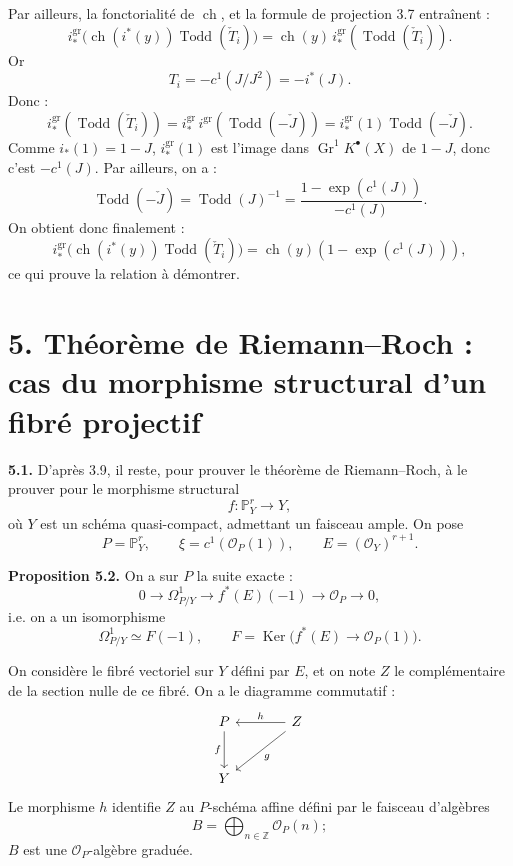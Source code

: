 \documentclass[11pt]{article}
\newcommand{\Gr}{\operatorname{Gr}}
\newcommand{\ch}{\operatorname{ch}}
\newcommand{\Todd}{\operatorname{Todd}}
\providecommand{\ch}{\operatorname{ch}}
\providecommand{\Todd}{\operatorname{Todd}}
\providecommand{\Gr}{\operatorname{Gr}}
\providecommand{\Ker}{\operatorname{Ker}}
\providecommand{\Gr}{\operatorname{G}}
\begin{document}
Par ailleurs, la fonctorialité de \(\ch\), et la formule de projection 3.7 entraînent :
\[
 i^{\mathrm{gr}}_*\bigl(\ch(i^*(y))\Todd(\check T_i)\bigr)
 =
 \ch(y)\,i^{\mathrm{gr}}_*(\Todd(\check T_i)).
\]
Or
\[
T_i=-c^1(J/J^2)=-i^*(J).
\]
Donc :
\[
 i^{\mathrm{gr}}_*(\Todd(\check T_i))
 =
 i^{\mathrm{gr}}_*\,i^{\mathrm{gr}}(\Todd(-\check J))
 =
 i^{\mathrm{gr}}_*(1)\Todd(-\check J).
\]
Comme \(i_*(1)=1-J\), \(i^{\mathrm{gr}}_*(1)\) est l'image dans \(\Gr^1K^{\bullet}(X)\) de \(1-J\), donc c'est \(-c^1(J)\). Par ailleurs, on a :
\[
 \Todd(-\check J)=\Todd(J)^{-1}
 =
 \frac{1-\exp(c^1(J))}{-c^1(J)}.
\]
On obtient donc finalement :
\[
 i^{\mathrm{gr}}_*\bigl(\ch(i^*(y))\Todd(\check T_i)\bigr)
 =
 \ch(y)(1-\exp(c^1(J))),
\]
ce qui prouve la relation à démontrer.

\section*{5. Théorème de Riemann--Roch : cas du morphisme structural d'un fibré projectif}

\textbf{5.1.} D'après 3.9, il reste, pour prouver le théorème de Riemann--Roch, à le prouver pour le morphisme structural
\[
f:\mathbb P^r_Y\longrightarrow Y,
\]
où \(Y\) est un schéma quasi-compact, admettant un faisceau ample. On pose
\[
P=\mathbb P^r_Y,\qquad \xi=c^1(\mathcal O_P(1)),\qquad E=(\mathcal O_Y)^{r+1}.
\]

\textbf{Proposition 5.2.} On a sur \(P\) la suite exacte :
\[
0\longrightarrow\Omega^1_{P/Y}\longrightarrow f^*(E)(-1)\longrightarrow\mathcal O_P\longrightarrow0,
\]
i.e. on a un isomorphisme
\[
\Omega^1_{P/Y}\simeq F(-1),
\qquad
F=\Ker\bigl(f^*(E)\longrightarrow\mathcal O_P(1)\bigr).
\]

On considère le fibré vectoriel sur \(Y\) défini par \(E\), et on note \(Z\) le complémentaire de la section nulle de ce fibré. On a le diagramme commutatif :
\[
\begin{tikzcd}[column sep=large,row sep=large]
P \arrow[d,"f"'] & Z \arrow[l,"h"'] \arrow[dl,"g"]\\
Y &
\end{tikzcd}
\]
Le morphisme \(h\) identifie \(Z\) au \(P\)-schéma affine défini par le faisceau d'algèbres
\[
B=\bigoplus_{n\in\mathbb Z}\mathcal O_P(n);
\]
\(B\) est une \(\mathcal O_P\)-algèbre graduée.
\end{document}
